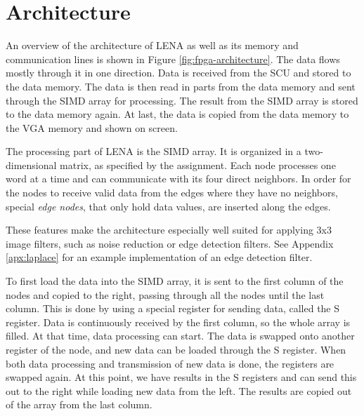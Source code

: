 \section{Architecture}



An overview of the architecture of \ac{LENA} as well as its memory and
communication lines is shown in Figure \ref{fig:fpga-architecture}. The data
flows mostly through it in one direction. Data is received from the SCU and
stored to the data memory. The data is then read in parts from the data memory
and sent through the \ac{SIMD} array for processing. The result from the
\ac{SIMD} array is stored to the data memory again.  At last, the data is copied
from the data memory to the \ac{VGA} memory and shown on screen.

The processing part of \ac{LENA} is the \ac{SIMD} array. It is organized
in a two-dimensional matrix, as specified by the assignment. Each node
processes one word at a time and can communicate with its four direct
neighbors. In order for the nodes to receive valid data from the edges
where they have no neighbors, special \emph{edge nodes}, that only hold
data values, are inserted along the edges.

These features make the architecture especially well suited for applying
3x3 image filters, such as noise reduction or edge detection filters.
See Appendix \ref{apx:laplace} for an example implementation of an edge
detection filter. 

To first load the data into the \ac{SIMD} array, it is sent to the first column
of the nodes and copied to the right, passing through all the nodes until the
last column. This is done by using a special register for sending data, called
the S register. Data is continuously received by the first column, so the whole
array is filled. At that time, data processing can start. The data is swapped
onto another register of the node, and new data can be loaded through the S
register. When both data processing and transmission of new data is done, the
registers are swapped again. At this point, we have results in the S registers
and can send this out to the right while loading new data from the left. The
results are copied out of the array from the last column.

